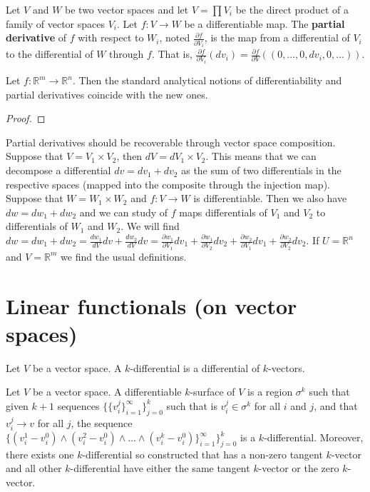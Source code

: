 \documentclass[11pt,letterpaper,fleqn]{memoir}
\begin{document}
\begin{defn}
	Let $V$ and $W$ be two vector spaces and let $V=\prod V_i$ be the direct product of a family of vector spaces $V_i$. Let $f: V \to W$ be a differentiable map. The \textbf{partial derivative} of $f$ with respect to $W_i$, noted $\frac{\partial f}{\partial V_i}$, is the map from a differential of $V_i$ to the differential of $W$ through $f$. That is, $\frac{\partial f}{\partial V_i} (dv_i) = \frac{\partial f}{\partial V} \left( (0, ..., 0, dv_i, 0, ...) \right)$.
\end{defn}

\begin{prop}
	Let $f:\mathbb{R}^m \to \mathbb{R}^n$. Then the standard analytical notions of differentiability and partial derivatives coincide with the new ones.
\end{prop}

\begin{proof}
\end{proof}


\begin{remark}
	Partial derivatives should be recoverable through vector space composition. Suppose that $V = V_1 \times V_2$, then $dV = dV_1 \times V_2$. This means that we can decompose a differential $dv= dv_1 + dv_2$ as the sum of two differentials in the respective spaces (mapped into the composite through the injection map). Suppose that $W = W_1 \times W_2$ and $f : V \to W$ is differentiable. Then we also have $dw= dw_1 + dw_2$ and we can study of $f$ maps differentials of $V_1$ and $V_2$ to differentials of $W_1$ and $W_2$. We will find $dw = dw_1 + dw_2 = \frac{dw_1}{dV} dv + \frac{dw_2}{dV} dv = \frac{\partial w_1}{\partial V_1} dv_1 + \frac{\partial w_1}{\partial V_2} dv_2 + \frac{\partial w_2}{\partial V_1} dv_1 + \frac{\partial w_2}{\partial V_2} dv_2$. If $U = \mathbb{R}^n$ and $V = \mathbb{R}^m$ we find the usual definitions.
\end{remark}

\section{Linear functionals (on vector spaces)}

\begin{defn}
	Let $V$ be a vector space. A $k$-differential is a differential of  $k$-vectors.
\end{defn}

\begin{defn}
	Let $V$ be a vector space. A differentiable $k$-surface of $V$ is a region $\sigma^k$ such that given $k+1$ sequences $\{ \{ {v}^j_i \}_{i=1}^{\infty}\}_{j=0}^{k}$ such that is ${v}^j_i \in \sigma^k$ for all $i$ and $j$, and that ${v}^j_i \to v$ for all $j$, the sequence $\{ ({v}^1_i - {v}^0_i) \wedge ({v}^2_i - {v}^0_i) \wedge ... \wedge ({v}^k_i - {v}^0_i) \}_{i=1}^{\infty}\}_{j=0}^{k}$ is a $k$-differential. Moreover, there exists one $k$-differential so constructed that has a non-zero tangent $k$-vector and all other $k$-differential have either the same tangent $k$-vector or the zero $k$-vector.
\end{defn}
\end{document}
